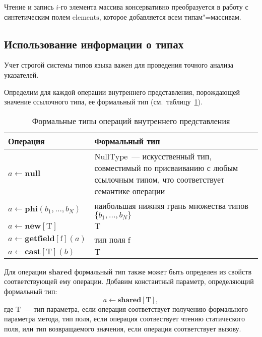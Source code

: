 \documentclass[14pt,titlepage,draft]{extarticle}
\newcommand{\java}{\eng{Java}\xspace}
\newcommand{\type}[1]{\mathrm{#1}}
\newcommand{\field}[1]{\mathrm{#1}}
\newcommand{\op}[1]{\mathbf{#1}}
\begin{document}
    Чтение и запись $i$-го элемента массива консервативно преобразуется в
    работу с синтетическим полем $\field{elements}$, которое добавляется всем
    типам"=массивам.

  \subsection{Использование информации о типах}
    \label{section:op_types}

    Учет строгой системы типов языка \java важен для проведения точного анализа
    указателей.

    Определим для каждой операции внутреннего представления, порождающей
    значение ссылочного типа, ее формальный тип
    (см.~таблицу~\ref{tabular:ops_types}).

    \begin{table}[htb]
      \centering

      \begin{tabular}{|p{}|p{}|}\hline
        \textbf{Операция} &
          \textbf{Формальный тип}\\ \hline

        $a \gets \op{null}$
        & $\type{NullType}$~--- искусственный тип, совместимый по
          присваиванию с любым ссылочным типом, что соответствует
          семантике операции
        \\ \hline

        $a \gets \op{phi}(b_1, \ldots, b_N)$
        & наибольшая нижняя грань множества типов $\{b_1, \ldots, b_N\}$
        \\ \hline

        $a \gets \op{new}[\type{T}]$
        & $\type{T}$
        \\ \hline

        $a \gets \op{getfield}[\field{f}](a)$
        & тип поля $\field{f}$
        \\ \hline

        $a \gets \op{cast}[\type{T}](b)$
        & $\type{T}$
        \\ \hline

      \end{tabular}
      \caption{Формальные типы операций внутреннего представления}
      \label{tabular:ops_types}
    \end{table}

    Для операции $\op{shared}$ формальный тип также может быть определен из
    свойств соответствующей ему \java операции.
    Добавим константный параметр, определяющий формальный тип:
    \[a \gets \op{shared}[\type{T}],\]
    где $\type{T}$~--- тип параметра, если операция соответствует
    получению формального параметра метода, тип поля, если операция
    соотвествует чтению статического поля, или тип возвращаемого значения,
    если операция соответствует вызову.
\end{document}
